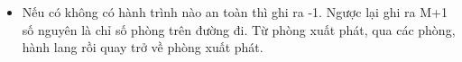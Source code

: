 \begin{itemize}
	\item Nếu có không có hành trình nào an toàn thì ghi ra -1. Ngược lại ghi ra M+1 số nguyên là chỉ số phòng trên đường đi. Từ phòng xuất phát, qua các phòng, hành lang rồi quay trở về phòng xuất phát.
\end{itemize}

\